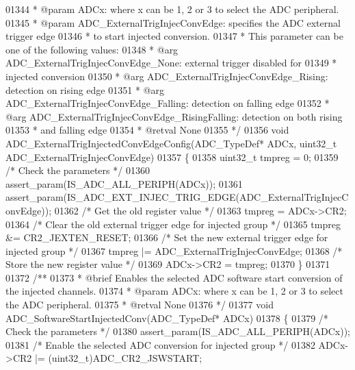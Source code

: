 \begin{DoxyCode}
01344 \textcolor{comment}{  * @param  ADCx: where x can be 1, 2 or 3 to select the ADC peripheral.}
01345 \textcolor{comment}{  * @param  ADC\_ExternalTrigInjecConvEdge: specifies the ADC external trigger edge}
01346 \textcolor{comment}{  *         to start injected conversion. }
01347 \textcolor{comment}{  *          This parameter can be one of the following values:}
01348 \textcolor{comment}{  *            @arg ADC\_ExternalTrigInjecConvEdge\_None: external trigger disabled for }
01349 \textcolor{comment}{  *                                                     injected conversion}
01350 \textcolor{comment}{  *            @arg ADC\_ExternalTrigInjecConvEdge\_Rising: detection on rising edge}
01351 \textcolor{comment}{  *            @arg ADC\_ExternalTrigInjecConvEdge\_Falling: detection on falling edge}
01352 \textcolor{comment}{  *            @arg ADC\_ExternalTrigInjecConvEdge\_RisingFalling: detection on both rising }
01353 \textcolor{comment}{  *                                                               and falling edge}
01354 \textcolor{comment}{  * @retval None}
01355 \textcolor{comment}{  */}
01356 \textcolor{keywordtype}{void} ADC_ExternalTrigInjectedConvEdgeConfig(ADC\_TypeDef* ADCx, uint32\_t ADC\_ExternalTrigInjecConvEdge)
01357 \{
01358   uint32\_t tmpreg = 0;
01359   \textcolor{comment}{/* Check the parameters */}
01360   assert_param(IS\_ADC\_ALL\_PERIPH(ADCx));
01361   assert_param(IS\_ADC\_EXT\_INJEC\_TRIG\_EDGE(ADC\_ExternalTrigInjecConvEdge));
01362   \textcolor{comment}{/* Get the old register value */}
01363   tmpreg = ADCx->CR2;
01364   \textcolor{comment}{/* Clear the old external trigger edge for injected group */}
01365   tmpreg &= CR2_JEXTEN_RESET;
01366   \textcolor{comment}{/* Set the new external trigger edge for injected group */}
01367   tmpreg |= ADC\_ExternalTrigInjecConvEdge;
01368   \textcolor{comment}{/* Store the new register value */}
01369   ADCx->CR2 = tmpreg;
01370 \}
01371 
01372 \textcolor{comment}{/**}
01373 \textcolor{comment}{  * @brief  Enables the selected ADC software start conversion of the injected channels.}
01374 \textcolor{comment}{  * @param  ADCx: where x can be 1, 2 or 3 to select the ADC peripheral.}
01375 \textcolor{comment}{  * @retval None}
01376 \textcolor{comment}{  */}
01377 \textcolor{keywordtype}{void} ADC_SoftwareStartInjectedConv(ADC\_TypeDef* ADCx)
01378 \{
01379   \textcolor{comment}{/* Check the parameters */}
01380   assert_param(IS\_ADC\_ALL\_PERIPH(ADCx));
01381   \textcolor{comment}{/* Enable the selected ADC conversion for injected group */}
01382   ADCx->CR2 |= (uint32\_t)ADC_CR2_JSWSTART;

\end{DoxyCode}
